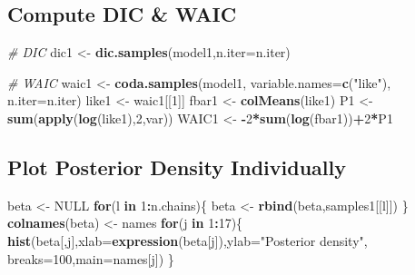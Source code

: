 \documentclass[
]{article}
\newenvironment{Shaded}{\begin{snugshade}}{\end{snugshade}}
\newcommand{\AttributeTok}[1]{\textcolor[rgb]{0.13,0.29,0.53}{#1}}
\newcommand{\CommentTok}[1]{\textcolor[rgb]{0.56,0.35,0.01}{\textit{#1}}}
\newcommand{\ConstantTok}[1]{\textcolor[rgb]{0.56,0.35,0.01}{#1}}
\newcommand{\ControlFlowTok}[1]{\textcolor[rgb]{0.13,0.29,0.53}{\textbf{#1}}}
\newcommand{\DecValTok}[1]{\textcolor[rgb]{0.00,0.00,0.81}{#1}}
\newcommand{\FunctionTok}[1]{\textcolor[rgb]{0.13,0.29,0.53}{\textbf{#1}}}
\newcommand{\NormalTok}[1]{#1}
\newcommand{\OtherTok}[1]{\textcolor[rgb]{0.56,0.35,0.01}{#1}}
\newcommand{\SpecialCharTok}[1]{\textcolor[rgb]{0.81,0.36,0.00}{\textbf{#1}}}
\newcommand{\StringTok}[1]{\textcolor[rgb]{0.31,0.60,0.02}{#1}}
\begin{document}
\subsection{Compute DIC \& WAIC}\label{compute-dic-waic}

\begin{Shaded}
\begin{Highlighting}[]
\CommentTok{\# DIC}
\NormalTok{dic1 }\OtherTok{\textless{}{-}} \FunctionTok{dic.samples}\NormalTok{(model1,}\AttributeTok{n.iter=}\NormalTok{n.iter)}

\CommentTok{\# WAIC}
\NormalTok{waic1 }\OtherTok{\textless{}{-}} \FunctionTok{coda.samples}\NormalTok{(model1, }\AttributeTok{variable.names=}\FunctionTok{c}\NormalTok{(}\StringTok{"like"}\NormalTok{), }\AttributeTok{n.iter=}\NormalTok{n.iter)}
\NormalTok{like1 }\OtherTok{\textless{}{-}}\NormalTok{ waic1[[}\DecValTok{1}\NormalTok{]]}
\NormalTok{fbar1 }\OtherTok{\textless{}{-}} \FunctionTok{colMeans}\NormalTok{(like1)}
\NormalTok{P1 }\OtherTok{\textless{}{-}} \FunctionTok{sum}\NormalTok{(}\FunctionTok{apply}\NormalTok{(}\FunctionTok{log}\NormalTok{(like1),}\DecValTok{2}\NormalTok{,var))}
\NormalTok{WAIC1 }\OtherTok{\textless{}{-}} \SpecialCharTok{{-}}\DecValTok{2}\SpecialCharTok{*}\FunctionTok{sum}\NormalTok{(}\FunctionTok{log}\NormalTok{(fbar1))}\SpecialCharTok{+}\DecValTok{2}\SpecialCharTok{*}\NormalTok{P1}
\end{Highlighting}
\end{Shaded}

\subsection{Plot Posterior Density
Individually}\label{plot-posterior-density-individually}

\begin{Shaded}
\begin{Highlighting}[]
\NormalTok{beta }\OtherTok{\textless{}{-}} \ConstantTok{NULL}
\ControlFlowTok{for}\NormalTok{(l }\ControlFlowTok{in} \DecValTok{1}\SpecialCharTok{:}\NormalTok{n.chains)\{}
\NormalTok{  beta }\OtherTok{\textless{}{-}} \FunctionTok{rbind}\NormalTok{(beta,samples1[[l]])}
\NormalTok{\}}
\FunctionTok{colnames}\NormalTok{(beta) }\OtherTok{\textless{}{-}}\NormalTok{ names}
\ControlFlowTok{for}\NormalTok{(j }\ControlFlowTok{in} \DecValTok{1}\SpecialCharTok{:}\DecValTok{17}\NormalTok{)\{}
  \FunctionTok{hist}\NormalTok{(beta[,j],}\AttributeTok{xlab=}\FunctionTok{expression}\NormalTok{(beta[j]),}\AttributeTok{ylab=}\StringTok{"Posterior density"}\NormalTok{,}
  \AttributeTok{breaks=}\DecValTok{100}\NormalTok{,}\AttributeTok{main=}\NormalTok{names[j])}
\NormalTok{\}}
\end{Highlighting}
\end{Shaded}
\end{document}
